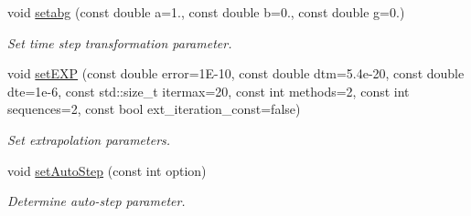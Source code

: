 \begin{DoxyCompactItemize}
void \hyperlink{classARC_1_1chainpars_a37f8af288217cbfc61a3593e21976d06}{setabg} (const double a=1., const double b=0., const double g=0.)
\begin{DoxyCompactList}\small\item\em Set time step transformation parameter. \end{DoxyCompactList}\item 
void \hyperlink{classARC_1_1chainpars_a1bef542db30755ac35cf064446874f6d}{set\+E\+XP} (const double error=1\+E-\/10, const double dtm=5.\+4e-\/20, const double dte=1e-\/6, const std\+::size\+\_\+t itermax=20, const int methods=2, const int sequences=2, const bool ext\+\_\+iteration\+\_\+const=false)
\begin{DoxyCompactList}\small\item\em Set extrapolation parameters. \end{DoxyCompactList}\item 
void \hyperlink{classARC_1_1chainpars_a7ea466feff01a06ace9af16eb5641b93}{set\+Auto\+Step} (const int option)
\begin{DoxyCompactList}\small\item\em Determine auto-\/step parameter. \end{DoxyCompactList}\end{DoxyCompactItemize}
